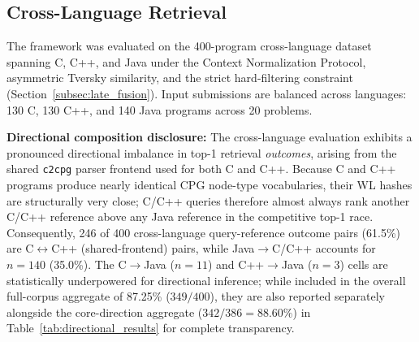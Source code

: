 \subsection{Cross-Language Retrieval}
\label{subsec:cross_lang_results}

The framework was evaluated on the 400-program cross-language dataset spanning C, C++, and Java under the Context Normalization Protocol, asymmetric Tversky similarity, and the strict hard-filtering constraint (Section~\ref{subsec:late_fusion}). Input submissions are balanced across languages: 130 C, 130 C++, and 140 Java programs across 20 problems.

\textbf{Directional composition disclosure:} The cross-language evaluation exhibits a pronounced directional imbalance in top-1 retrieval \textit{outcomes}, arising from the shared \texttt{c2cpg} parser frontend used for both C and C++. Because C and C++ programs produce nearly identical CPG node-type vocabularies, their WL hashes are structurally very close; C/C++ queries therefore almost always rank another C/C++ reference above any Java reference in the competitive top-1 race. Consequently, 246 of 400 cross-language query-reference outcome pairs (61.5\%) are C$\leftrightarrow$C++ (shared-frontend) pairs, while Java$\rightarrow$C/C++ accounts for $n=140$ (35.0\%). The C$\rightarrow$Java ($n=11$) and C++$\rightarrow$Java ($n=3$) cells are statistically underpowered for directional inference; while included in the overall full-corpus aggregate of 87.25\% ($349/400$), they are also reported separately alongside the core-direction aggregate ($342/386 = 88.60\%$) in Table~\ref{tab:directional_results} for complete transparency. 

